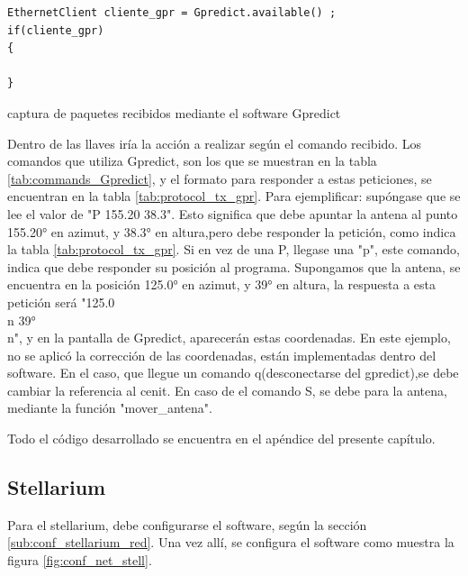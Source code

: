 \begin{listing}[ht]
	\begin{verbatim}
EthernetClient cliente_gpr = Gpredict.available() ;
if(cliente_gpr)
{

}
	\end{verbatim}
\caption{captura de paquetes recibidos mediante el software Gpredict}
\label{cod:cliente_gpr}
\end{listing}

Dentro de las llaves iría la acción a realizar según el comando recibido. Los comandos que utiliza Gpredict, son los que se muestran en la tabla \ref{tab:commands_Gpredict}, y el formato para responder a estas peticiones, se encuentran en la tabla \ref{tab:protocol_tx_gpr}.
Para ejemplificar: supóngase que se lee el valor de "P 155.20 38.3". Esto significa que debe apuntar la antena al punto 155.20° en azimut, y 38.3° en altura,pero  debe responder la petición, como indica la tabla \ref{tab:protocol_tx_gpr}. Si en vez de una P, llegase una "p", este comando, indica que debe responder su posición al programa. Supongamos que la antena, se encuentra en la posición 125.0° en azimut, y 39° en altura, la respuesta a esta petición será "125.0\\n 39°\\n", y en la pantalla de Gpredict, aparecerán estas coordenadas. En este ejemplo, no se aplicó la corrección de las coordenadas, están implementadas dentro del software. En el caso, que llegue un comando q(desconectarse del gpredict),se debe cambiar la referencia al cenit. En caso de el comando S, se debe para la antena, mediante la función "mover\_antena". 

Todo el código desarrollado se encuentra en el apéndice del presente capítulo. 




\subsection{Stellarium}

Para el stellarium, debe configurarse el software, según la sección \ref{sub:conf_stellarium_red}. Una vez allí, se configura el software como muestra la figura \ref{fig:conf_net_stell}. 

